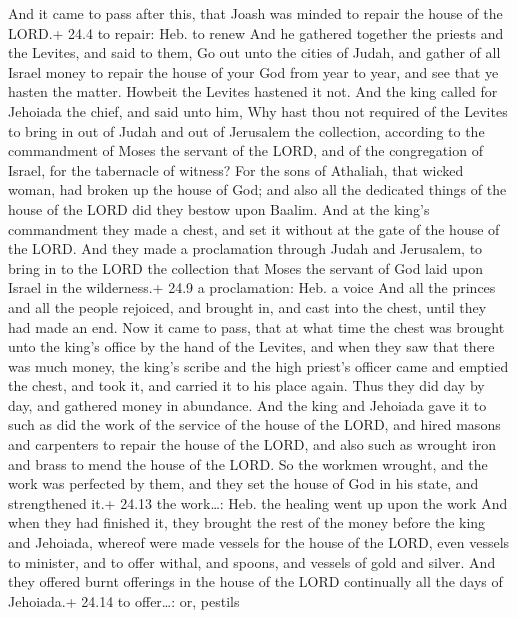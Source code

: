  And it came to pass after this, that Joash was minded to
repair the house of the LORD.+ 24.4 to repair: Heb. to renew
 And he gathered together the priests and the Levites, and
said to them, Go out unto the cities of Judah, and gather of all Israel
money to repair the house of your God from year to year, and see that ye
hasten the matter. Howbeit the Levites hastened it not.  And
the king called for Jehoiada the chief, and said unto him, Why hast thou
not required of the Levites to bring in out of Judah and out of
Jerusalem the collection, according to the commandment of Moses the
servant of the LORD, and of the congregation of Israel, for the
tabernacle of witness?  For the sons of Athaliah, that
wicked woman, had broken up the house of God; and also all the dedicated
things of the house of the LORD did they bestow upon Baalim.
 And at the king's commandment they made a chest, and set it
without at the gate of the house of the LORD.  And they made
a proclamation through Judah and Jerusalem, to bring in to the LORD the
collection that Moses the servant of God laid upon Israel in the
wilderness.+ 24.9 a proclamation: Heb. a voice  And all the
princes and all the people rejoiced, and brought in, and cast into the
chest, until they had made an end.  Now it came to pass,
that at what time the chest was brought unto the king's office by the
hand of the Levites, and when they saw that there was much money, the
king's scribe and the high priest's officer came and emptied the chest,
and took it, and carried it to his place again. Thus they did day by
day, and gathered money in abundance.  And the king and
Jehoiada gave it to such as did the work of the service of the house of
the LORD, and hired masons and carpenters to repair the house of the
LORD, and also such as wrought iron and brass to mend the house of the
LORD.  So the workmen wrought, and the work was perfected
by them, and they set the house of God in his state, and strengthened
it.+ 24.13 the work\ldots: Heb. the healing went up upon the work
 And when they had finished it, they brought the rest of
the money before the king and Jehoiada, whereof were made vessels for
the house of the LORD, even vessels to minister, and to offer withal,
and spoons, and vessels of gold and silver. And they offered burnt
offerings in the house of the LORD continually all the days of
Jehoiada.+ 24.14 to offer\ldots: or, pestils

